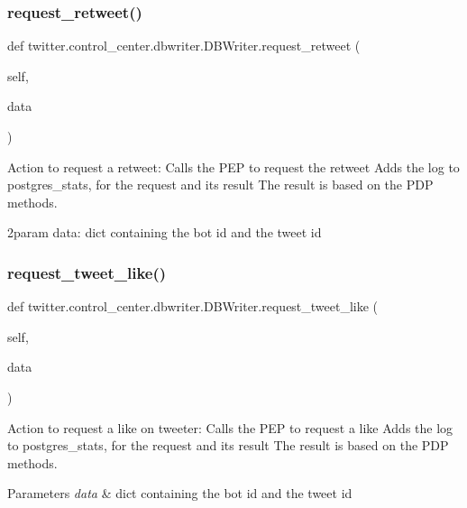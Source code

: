 \subsubsection{\texorpdfstring{request\+\_\+retweet()}{request\_retweet()}}
{\footnotesize\ttfamily def twitter.\+control\+\_\+center.\+dbwriter.\+D\+B\+Writer.\+request\+\_\+retweet (\begin{DoxyParamCaption}\item[{}]{self,  }\item[{}]{data }\end{DoxyParamCaption})}



Action to request a retweet\+: Calls the P\+EP to request the retweet Adds the log to postgres\+\_\+stats, for the request and its result The result is based on the P\+DP methods. 

2param data\+: dict containing the bot id and the tweet id \mbox{\label{classtwitter_1_1control__center_1_1dbwriter_1_1DBWriter_acb9c768e2862639056ef226e2eab77ec}} 
\subsubsection{\texorpdfstring{request\+\_\+tweet\+\_\+like()}{request\_tweet\_like()}}
{\footnotesize\ttfamily def twitter.\+control\+\_\+center.\+dbwriter.\+D\+B\+Writer.\+request\+\_\+tweet\+\_\+like (\begin{DoxyParamCaption}\item[{}]{self,  }\item[{}]{data }\end{DoxyParamCaption})}



Action to request a like on tweeter\+: Calls the P\+EP to request a like Adds the log to postgres\+\_\+stats, for the request and its result The result is based on the P\+DP methods. 


\begin{DoxyParams}{Parameters}
{\em data} & dict containing the bot id and the tweet id \\
\hline
\end{DoxyParams}
\mbox{\label{classtwitter_1_1control__center_1_1dbwriter_1_1DBWriter_a876d7b694fb3f54940e7f07afcbb0c09}} 
